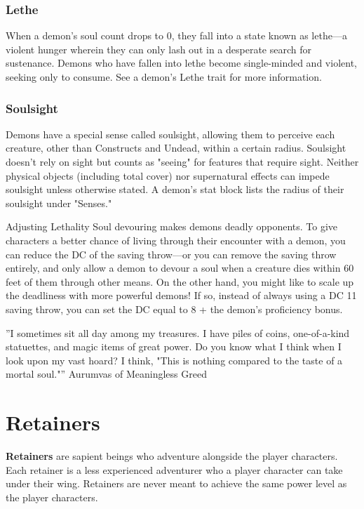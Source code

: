 \documentclass[10pt,a4paper,twoside,bg=print,twocolumn,openany,nodeprecatedcode]{dndbook}
\begin{document}
\subsubsection{Lethe}
When a demon's soul count drops to 0, they fall into a state known as lethe—a violent hunger wherein they can only lash out in a desperate search for sustenance. Demons who have fallen into lethe become single-minded and violent, seeking only to consume. See a demon's Lethe trait for more information.

\subsubsection{Soulsight}
Demons have a special sense called soulsight, allowing them to perceive each creature, other than Constructs and Undead, within a certain radius. Soulsight doesn't rely on sight but counts as "seeing" for features that require sight. Neither physical objects (including total cover) nor supernatural effects can impede soulsight unless otherwise stated. A demon's stat block lists the radius of their soulsight under "Senses."

\begin{DndSidebar}[float=!b]{Adjusting Lethality}
Soul devouring makes demons deadly opponents. To give characters a better chance of living through their encounter with a demon, you can reduce the DC of the saving throw—or you can remove the saving throw entirely, and only allow a demon to devour a soul when a creature dies within 60 feet of them through other means. On the other hand, you might like to scale up the deadliness with more powerful demons! If so, instead of always using a DC 11 saving throw, you can set the DC equal to 8 + the demon's proficiency bonus.



\end{DndSidebar}

\DndQuote%
{}
{''I sometimes sit all day among my treasures. I have piles of coins, one-of-a-kind statuettes, and magic items of great power. Do you know what I think when I look upon my vast hoard? I think, "This is nothing compared to the taste of a mortal soul."''}
{Aurumvas of Meaningless Greed}
\section{Retainers}
\textbf{Retainers} are sapient beings who adventure alongside the player characters. Each retainer is a less experienced adventurer who a player character can take under their wing. Retainers are never meant to achieve the same power level as the player characters.
\end{document}
